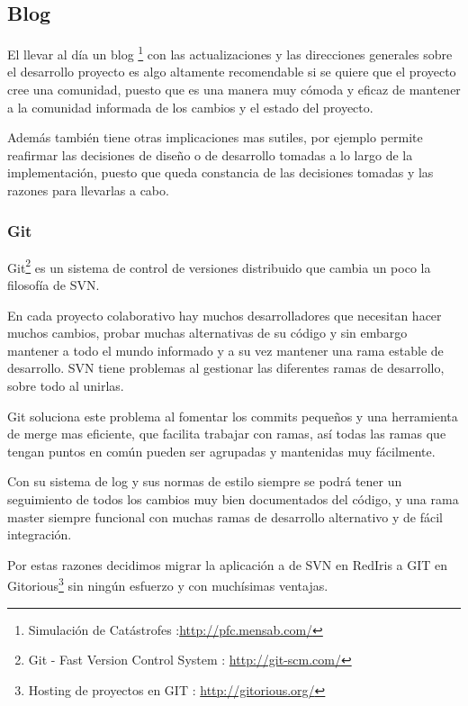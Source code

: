 \subsection*{Blog}
El llevar al día un blog \footnote{Simulación de Catástrofes
:\url{http://pfc.mensab.com/}} con las actualizaciones y las direcciones
generales sobre el desarrollo proyecto es algo altamente recomendable si se
quiere que el proyecto cree una comunidad, puesto que es una manera muy cómoda y
eficaz de mantener a la comunidad informada de los cambios y el estado del
proyecto.

Además también tiene otras implicaciones mas sutiles, por ejemplo permite
reafirmar las decisiones de diseño o de desarrollo tomadas a lo largo de la
implementación, puesto que queda constancia de las decisiones tomadas y las
razones para llevarlas a cabo.
\subsubsection*{Git}
Git\footnote{Git - Fast Version Control System : \url{http://git-scm.com/}} es
un sistema de control de versiones distribuido que cambia un poco la filosofía
de SVN.

En cada proyecto colaborativo hay muchos desarrolladores que necesitan hacer
muchos cambios, probar muchas alternativas de su código y sin embargo mantener
a todo el mundo informado y a su vez mantener una rama estable de desarrollo.
SVN tiene problemas al gestionar las diferentes ramas de desarrollo, sobre todo
al unirlas.

Git soluciona este problema al fomentar los commits pequeños y una herramienta
de merge mas eficiente, que facilita trabajar con ramas, así todas las ramas
que tengan puntos en común pueden ser agrupadas y mantenidas muy fácilmente.

Con su sistema de log y sus normas de estilo siempre se podrá tener un
seguimiento de todos los cambios muy bien documentados del código, y una rama
master siempre funcional con muchas ramas de desarrollo alternativo y de fácil
integración.

Por estas razones decidimos migrar la aplicación a de SVN en RedIris a GIT en
Gitorious\footnote{Hosting de proyectos en GIT :
\url{http://gitorious.org/}} sin ningún esfuerzo y con muchísimas ventajas.

